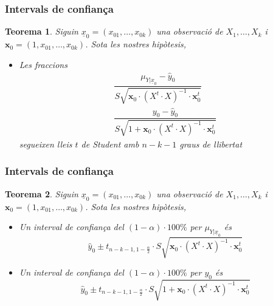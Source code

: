 \documentclass[12pt,t]{beamer}
\theoremstyle{plain}
\newtheorem{teorema}{Teorema}
\theoremstyle{definition}
\begin{document}
\begin{frame}
\frametitle{Intervals de confiança}
\begin{teorema}
Siguin $\underline{x}_0=(x_{01},\ldots,x_{0k})$ una observació de $X_1,\ldots,X_k$ i $\mathbf{x}_0=(1,x_{01},\ldots,x_{0k})$. 
Sota les nostres hipòtesis, 
\medskip

\begin{itemize}
\item Les fraccions 
$$
\begin{array}{l}
\dfrac{\mu_{Y|\underline{x}_0}-\widehat{y}_0}{S\sqrt{\mathbf{x}_0\cdot (X^t \cdot X)^{-1}\cdot \mathbf{x}_0^t}}\\[3ex]
\dfrac{y_0-\widehat{y}_0}{S\sqrt{1+\mathbf{x}_0\cdot  (X^t \cdot X)^{-1}\cdot \mathbf{x}_0^t}}
\end{array}
$$
segueixen lleis $t$ de Student amb $n-k-1$ graus de llibertat
\end{itemize}
\end{teorema}
\end{frame}


\begin{frame}
\frametitle{Intervals de confiança}
\begin{teorema}
Siguin $\underline{x}_0=(x_{01},\ldots,x_{0k})$ una observació de $X_1,\ldots,X_k$ i $\mathbf{x}_0=(1,x_{01},\ldots,x_{0k})$. 
Sota les nostres hipòtesis, 
\medskip

\begin{itemize}

\item Un interval de confiança del $(1-\alpha)\cdot 100\%$ per $\mu_{Y|\underline{x}_0}$ és
$$
\widehat{y}_0\pm t_{n-k-1,1-\frac{\alpha}{2}}\cdot S\sqrt{\mathbf{x}_0\cdot(X^t  \cdot X)^{-1}\cdot \mathbf{x}_0^t}
$$
\medskip

\item Un interval de confiança del $(1-\alpha)\cdot 100\%$ per $y_0$ és
$$
\widehat{y}_0\pm t_{n-k-1,1-\frac{\alpha}{2}}\cdot S\sqrt{1+\mathbf{x}_0\cdot(X^t  \cdot X)^{-1}\cdot \mathbf{x}_0^t}
$$
\end{itemize}
\end{teorema}
\end{frame}
\end{document}
